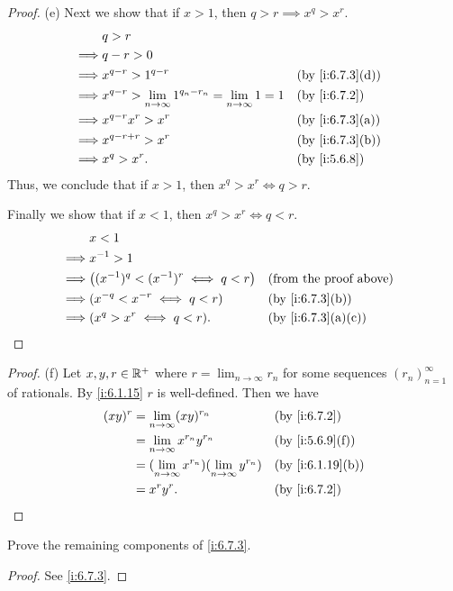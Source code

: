 \begin{proof}{(e)}
  Next we show that if \(x > 1\), then \(q > r \implies x^q > x^r\).
  \begin{align*}
             & q > r                                                                                          \\
    \implies & q - r > 0                                                                                      \\
    \implies & x^{q - r} > 1^{q - r}                                                     &  & \by{i:6.7.3}[d] \\
    \implies & x^{q - r} > \lim_{n \to \infty} 1^{q_n - r_n} = \lim_{n \to \infty} 1 = 1 &  & \by{i:6.7.2}    \\
    \implies & x^{q - r} x^r > x^r                                                       &  & \by{i:6.7.3}[a] \\
    \implies & x^{q - r + r} > x^r                                                       &  & \by{i:6.7.3}[b] \\
    \implies & x^q > x^r.                                                                &  & \by{i:5.6.8}
  \end{align*}
  Thus, we conclude that if \(x > 1\), then \(x^q > x^r \iff q > r\).

  Finally we show that if \(x < 1\), then \(x^q > x^r \iff q < r\).
  \begin{align*}
             & x < 1                                                                           \\
    \implies & x^{-1} > 1                                                                      \\
    \implies & \big((x^{-1})^q < (x^{-1})^r \iff q < r\big) &  & \text{(from the proof above)} \\
    \implies & (x^{-q} < x^{-r} \iff q < r)                 &  & \by{i:6.7.3}[b]               \\
    \implies & (x^q > x^r \iff q < r).                      &  & \by{i:6.7.3}[a,c]
  \end{align*}
\end{proof}

\begin{proof}{(f)}
  Let \(x, y, r \in \mathbb{R}^+\) where \(r = \lim_{n \to \infty} r_n\) for some sequences \((r_n)_{n = 1}^\infty\) of rationals.
  By \cref{i:6.1.15} \(r\) is well-defined.
  Then we have
  \begin{align*}
    (xy)^r & = \lim_{n \to \infty} (xy)^{r_n}                             &  & \by{i:6.7.2}     \\
           & = \lim_{n \to \infty} x^{r_n} y^{r_n}                        &  & \by{i:5.6.9}[f]  \\
           & = (\lim_{n \to \infty} x^{r_n})(\lim_{n \to \infty} y^{r_n}) &  & \by{i:6.1.19}[b] \\
           & = x^r y^r.                                                   &  & \by{i:6.7.2}
  \end{align*}
\end{proof}

\exercisesection

\begin{ex}\label{i:ex:6.7.1}
  Prove the remaining components of \cref{i:6.7.3}.
\end{ex}

\begin{proof}
  See \cref{i:6.7.3}.
\end{proof}
